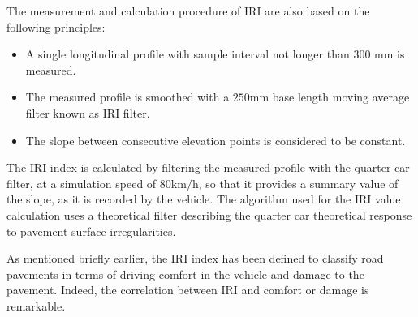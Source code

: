 \documentclass[tesi]{subfiles}
\begin{document}
The measurement and calculation procedure of IRI are also based on the following principles:
\begin{itemize}

\item A single longitudinal profile with sample interval not longer than $300$ $\si{\milli\meter}$ is measured.
\item The measured profile is smoothed with a $250$\si{\milli\meter} base length moving average filter known as IRI filter.
\item The slope between consecutive elevation points is considered to be constant.

\end{itemize}
The IRI index is calculated by filtering the measured profile with the quarter car filter, at a simulation speed of $\num{80} \si{\km\per\hour}$, so that it provides a summary value of the slope, as it is recorded by the vehicle. The algorithm used for the IRI value calculation uses a theoretical filter describing the quarter car theoretical response to pavement surface irregularities.

As mentioned briefly earlier, the IRI index has been defined to classify road pavements in terms of driving comfort in the vehicle and damage to the pavement. Indeed, the correlation between IRI and comfort or damage is remarkable\cite{gillespie1992everything}.
\end{document}
